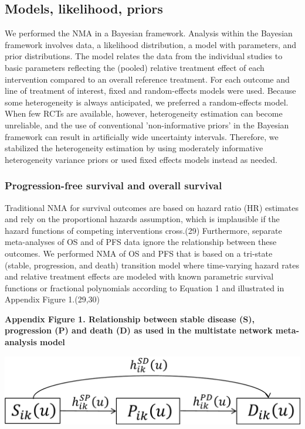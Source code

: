 \documentclass[11pt,final,fleqn]{article}\usepackage[]{graphicx}\usepackage[]{color}
\theoremstyle{plain}
\begin{document}
{\begin{appendices}
\subsection{Models, likelihood, priors}

We performed the NMA in a Bayesian framework.  Analysis within the Bayesian framework involves data, a likelihood distribution, a model with parameters, and prior distributions.  The model relates the data from the individual studies to basic parameters reflecting the (pooled) relative treatment effect of each intervention compared to an overall reference treatment.  For each outcome and line of treatment of interest, fixed and random-effects models were used.  Because some heterogeneity is always anticipated, we preferred a random-effects model.  When few RCTs are available, however, heterogeneity estimation can become unreliable, and the use of conventional 'non-informative priors' in the Bayesian framework can result in artificially wide uncertainty intervals.  Therefore, we stabilized the heterogeneity estimation by using moderately informative heterogeneity variance priors or used fixed effects models instead as needed.

\subsubsection{Progression-free survival and overall survival}

Traditional NMA for survival outcomes are based on hazard ratio (HR) estimates and rely on the proportional hazards assumption, which is implausible if the hazard functions of competing interventions cross.(29) Furthermore, separate meta-analyses of OS and of PFS data ignore the relationship between these outcomes. We performed NMA of OS and PFS that is based on a tri-state (stable, progression, and death) transition model where time-varying hazard rates and relative treatment effects are modeled with known parametric survival functions or fractional polynomials according to Equation 1 and illustrated in Appendix Figure 1.(29,30)

\textbf{Appendix Figure 1. Relationship between stable disease (S), progression (P) and death (D) as used in the multistate network meta-analysis model }

\includegraphics[scale=0.4]{Appendix Figure 1.png} 


\end{appendices}}
\end{document}
